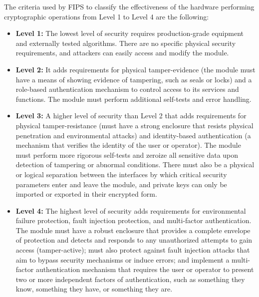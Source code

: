 The criteria used by FIPS to classify the effectiveness of the hardware performing cryptographic operations from Level 1 to Level 4 are the following: 
\begin{itemize}
    \item \textbf{Level 1:} The lowest level of security requires production-grade equipment and externally tested algorithms. There are no specific physical security requirements, and attackers can easily access and modify the module.
    \item \textbf{Level 2:} It adds requirements for physical tamper-evidence (the module must have a means of showing evidence of tampering, such as seals or locks) and a role-based authentication mechanism to control access to its services and functions. The module must perform additional self-tests and error handling.
    \item \textbf{Level 3:} A higher level of security than Level 2 that adds requirements for physical tamper-resistance (must have a strong enclosure that resists physical penetration and environmental attacks) and identity-based authentication (a mechanism that verifies the identity of the user or operator). The module must perform more rigorous self-tests and zeroize all sensitive data upon detection of tampering or abnormal conditions. There must also be a physical or logical separation between the interfaces by which critical security parameters enter and leave the module, and private keys can only be imported or exported in their encrypted form.
    \item \textbf{Level 4:} The highest level of security adds requirements for environmental failure protection, fault injection protection, and multi-factor authentication. The module must have a robust enclosure that provides a complete envelope of protection and detects and responds to any unauthorized attempts to gain access (tamper-active); must also protect against fault injection attacks that aim to bypass security mechanisms or induce errors; and implement a multi-factor authentication mechanism that requires the user or operator to present two or more independent factors of authentication, such as something they know, something they have, or something they are.
\end{itemize}

